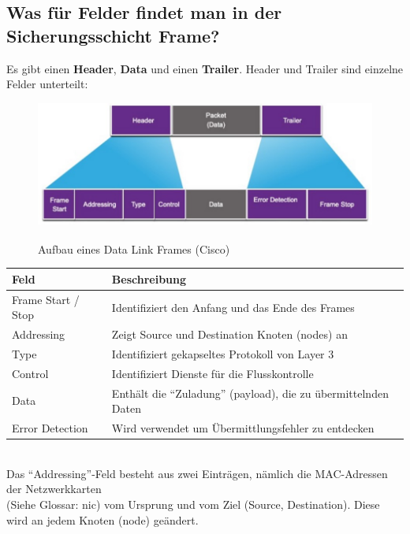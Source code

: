 \subsection*{Was für Felder findet man in der Sicherungsschicht Frame?}
Es gibt einen \textbf{Header}, \textbf{Data} und einen \textbf{Trailer}. Header und Trailer sind einzelne Felder unterteilt:

\begin{figure}[H]
    \begin{center}
    \label{pic:DataLinkFrame}
    \includegraphics[width=\textwidth]{images/Data_Link_Frame.jpg}
    \caption{Aufbau eines Data Link Frames (\textsuperscript{\textcopyright}Cisco)}
    \end{center}
\end{figure}

\begin{tabularx}{\textwidth}{lX}
    Feld&Beschreibung\\
    \hline
    Frame Start / Stop&Identifiziert den Anfang und das Ende des Frames\\
    Addressing&Zeigt Source und Destination Knoten (nodes) an\\
    Type&Identifiziert gekapseltes Protokoll von Layer 3\\
    Control&Identifiziert Dienste für die Flusskontrolle\\
    Data&Enthält die "`Zuladung"' (payload), die zu übermittelnden Daten\\
    Error Detection&Wird verwendet um Übermittlungsfehler zu entdecken\\
    \hline
\end{tabularx}\\

Das "`Addressing"'-Feld besteht aus zwei Einträgen, nämlich die MAC-Adressen der Netzwerkkarten\\
(Siehe Glossar: \acrshort{nic}) vom Ursprung und vom Ziel (Source, Destination). Diese wird an jedem Knoten (node) geändert.

